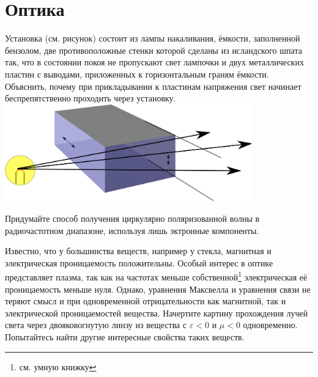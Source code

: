\chapter{Оптика}
\thispagestyle{empty}
\clearpage
\begin{problem}
Установка (см. рисунок) состоит из лампы накаливания, ёмкости, заполненной бензолом, две противоположные стенки которой сделаны из исландского шпата так, что в состоянии покоя не пропускают свет лампочки и двух металлических пластин с выводами, приложенных к горизонтальным граням ёмкости. Объяснить, почему при прикладывании к пластинам напряжения свет начинает беспрепятственно проходить через установку.
{\includegraphics[width=0.8\textwidth]{./kerr}}
\end{problem}
\begin{problem}
Придумайте способ получения циркулярно поляризованной волны в радиочастотном диапазоне, используя лишь эктронные компоненты.
\end{problem}
\begin{problem}
Известно, что у большинства веществ, например у стекла, магнитная и электрическая проницаемость положительны. Особый интерес в оптике представляет плазма, так как на частотах меньше собственной\footnote{см. умную книжку} электрическая её проницаемость меньше нуля. Однако, уравнения Максвелла и уравнения связи не теряют смысл и при одновременной отрицательности как магнитной, так и электрической проницаемостей вещества. Начертите картину прохождения лучей света через двояковогнутую линзу из вещества с $\varepsilon<0$ и $\mu<0$ одновременно. Попытайтесь найти другие интересные свойства таких веществ.
\end{problem}